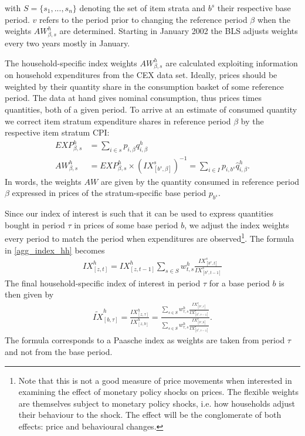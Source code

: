 \documentclass{article}
\begin{document}
with $S = \{s_1,...,s_n\}$ denoting the set of item strata and $b^s$ their respective base period. $v$ refers to the period prior to changing the reference period $\beta$ when the weights $AW^h_{\beta,s}$ are determined.  Starting in January 2002 the BLS adjusts weights every two years mostly in January. %

The household-specific index weights $AW^h_{\beta,s}$ are calculated exploiting information on household expenditures from the CEX data set. Ideally, prices should be weighted by their quantity share in the consumption basket of some reference period. The data at hand gives nominal consumption, thus prices times quantities, both of a given period. To arrive at an estimate of consumed quantity we correct item stratum expenditure shares in reference period $\beta$ by the respective item stratum CPI:
\begin{align*}
    EXP^h_{\beta,s}&=\sum_{i\in s} p_{i,\beta}q^h_{i,\beta}  \\
    AW^h_{\beta,s}&=  EXP^h_{\beta,s} \times (IX^s_{[b^s,\beta]})^{-1}
    =\sum_{ i \in I}p_{i, b^s}\hat{q}^h_{i,\beta}.%
\end{align*}
In words, the weights $AW$ are given by the quantity consumed in reference period $\beta$ expressed in prices of the stratum-specific base period $p_{b^s}$.

Since our index of interest is such that it can be used to express quantities bought in period $\tau$ in prices of some base period $b$, we adjust the index weights every period to match the period when expenditures are observed\footnote{ Note that this is not a good measure of price movements when interested in examining the effect of monetary policy shocks on prices. The flexible weights are themselves subject to monetary policy shocks, i.e. how households adjust their behaviour to the shock. The effect will be the conglomerate of both effects: price and behavioural changes.  }. %
The formula in \ref{agg_index_hh} becomes  
\begin{align*}
    IX^h_{[z,t]}= IX^h_{[z,t-1]}\sum_{s\in S}w^h_{t,s}\frac{IX^s_{[b^s,t]}}{IX^s_{[b^s,t-1]}}
\end{align*}
The final household-specific index of interest in period $\tau$ for a base period $b$ is then given by
\begin{align*}
   \widetilde{IX}^h_{[b,\tau]}=\frac{IX^h_{[z,\tau]}}{IX^h_{[z,b]}}= \frac{\sum_{s\in S}w^h_{\tau,s}\frac{IX^s_{[b^s,\tau]}}{IX^s_{[b^s,\tau-1]}}}{\sum_{s\in S}w^h_{\tau,s}\frac{IX^s_{[b^s,b]}}{IX^s_{[b^s,\tau-1]}}}.
\end{align*}
The formula corresponds to a Paasche index as weights are taken from period $\tau$ and not from the base period. 
\end{document}
